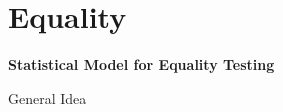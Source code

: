 \section{Equality}

\begin{frame}{}

  \begin{center}
    {\large {\bf
        Statistical Model for Equality Testing
    }}
  \end{center}
  
\end{frame}

\begin{frame}{General Idea}
\end{frame}



